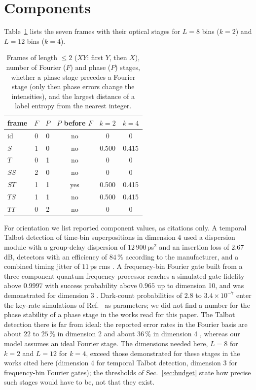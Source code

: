 \documentclass[aps,pra,reprint,superscriptaddress,nofootinbib]{revtex4-2}
\begin{document}
\section{Components}
Table~\ref{tab:words} lists the seven frames with their optical stages for $L=8$ bins ($k=2$) and $L=12$ bins ($k=4$).
\begin{table}[t]
\caption{\label{tab:words}Frames of length $\le2$ ($XY$: first $Y$, then $X$), number of Fourier ($F$) and phase ($P$) stages, whether a phase stage precedes a Fourier stage (only then phase errors change the intensities), and the largest distance of a label entropy from the nearest integer.}
\begin{ruledtabular}
\begin{tabular}{lccccc}
frame & $F$ & $P$ & $P$ before $F$ & $k=2$ & $k=4$\\
\hline
id & 0 & 0 & no & 0 & 0\\
$S$ & 1 & 0 & no & 0.500 & 0.415\\
$T$ & 0 & 1 & no & 0 & 0\\
$SS$ & 2 & 0 & no & 0 & 0\\
$ST$ & 1 & 1 & yes & 0.500 & 0.415\\
$TS$ & 1 & 1 & no & 0.500 & 0.415\\
$TT$ & 0 & 2 & no & 0 & 0\\
\end{tabular}
\end{ruledtabular}
\end{table}
For orientation we list reported component values, as citations only.
A temporal Talbot detection of time-bin superpositions in dimension 4 used a dispersion module with a group-delay dispersion of $12\,900$\,ps$^2$ and an insertion loss of $2.67$\,dB, detectors with an efficiency of $84\,\%$ according to the manufacturer, and a combined timing jitter of $11$\,ps rms \cite{Ogrodnik2025}.
A frequency-bin Fourier gate built from a three-component quantum frequency processor reaches a simulated gate fidelity above $0.9997$ with success probability above $0.965$ up to dimension 10, and was demonstrated for dimension 3 \cite{Lu2022}.
Dark-count probabilities of $2.8$ to $3.4\times10^{-7}$ enter the key-rate simulations of Ref.~\cite{Ogrodnik2025} as parameters; we did not find a number for the phase stability of a phase stage in the works read for this paper. The Talbot detection there is far from ideal: the reported error rates in the Fourier basis are about $22$ to $25\,\%$ in dimension 2 and about $36\,\%$ in dimension 4 \cite{Ogrodnik2025}, whereas our model assumes an ideal Fourier stage.
The dimensions needed here, $L=8$ for $k=2$ and $L=12$ for $k=4$, exceed those demonstrated for these stages in the works cited here (dimension 4 for temporal Talbot detection, dimension 3 for frequency-bin Fourier gates); the thresholds of Sec.~\ref{sec:budget} state how precise such stages would have to be, not that they exist.
\end{document}

